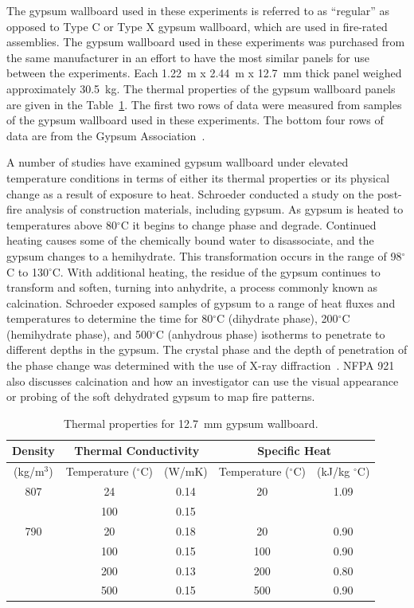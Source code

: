 \documentclass[twoside]{uocthesis}
\begin{document}
{The gypsum wallboard used in these experiments is referred to as ``regular'' as opposed to Type C or Type X gypsum wallboard, which are used in fire-rated assemblies. The gypsum wallboard used in these experiments was purchased from the same manufacturer in an effort to have the most similar panels for use between the experiments. Each 1.22~m x 2.44~m x 12.7~mm thick panel weighed approximately 30.5~kg.  The thermal properties of the gypsum wallboard panels are given in the Table~\ref{tab:Gypsum wallboard_Thermal_Properties}.  The first two rows of data were measured from samples of the gypsum wallboard used in these experiments.  The bottom four rows of data are from the Gypsum Association~\cite{Gross:1985}.

A number of studies have examined gypsum wallboard under elevated temperature conditions in terms of either its thermal properties or its physical change as a result of exposure to heat.  Schroeder conducted a study on the post-fire analysis of construction materials, including gypsum.  As gypsum is heated to temperatures above 80$^\circ$C it begins to change phase and degrade.  Continued heating causes some of the chemically bound water to disassociate, and the gypsum changes to a hemihydrate.  This transformation occurs in the range of 98$^\circ$C to 130$^\circ$C. With additional heating, the residue of the gypsum continues to transform and soften, turning into anhydrite, a process commonly known as calcination.  Schroeder exposed samples of gypsum to a range of heat fluxes and temperatures to determine the time for 80$^\circ$C (dihydrate phase), 200$^\circ$C (hemihydrate phase), and 500$^\circ$C (anhydrous phase) isotherms to penetrate to different depths in the gypsum.  The crystal phase and the depth of penetration of the phase change was determined with the use of X-ray diffraction~\cite{Schroeder:1999}.  NFPA 921 also discusses calcination and how an investigator can use the visual appearance or probing of the soft dehydrated gypsum to map fire patterns.

\begin{table}
	\centering
	\begin{tabular}{|c|c|c|c|c|}
		\hline Density & \multicolumn{2}{c|}{Thermal Conductivity}   & \multicolumn{2}{c|}{Specific Heat}  \\
		\hline (kg/m$^3$) & Temperature ($^{\circ}$C) & (W/mK)  & Temperature ($^{\circ}$C)  & (kJ/kg $^{\circ}$C) \\ 
		\hline 807  & 24 	& 0.14 	& 20	& 1.09 \\
		\hline  	& 100 	& 0.15  &  		&  \\
		\hline 790 	& 20 	& 0.18	& 20 	& 0.90 \\
		\hline  	& 100 	& 0.15 	& 100 	& 0.90 \\
		\hline  	& 200 	& 0.13 	& 200 	& 0.80 \\
		\hline  	& 500 	& 0.15 	& 500	& 0.90 \\
		\hline
		\end{tabular}
		\caption[Thermal properties for 12.7~mm gypsum wallboard.]{Thermal properties for 12.7~mm gypsum wallboard.}
		\label{tab:Gypsum wallboard_Thermal_Properties}
		\end{table}


}
\end{document}
